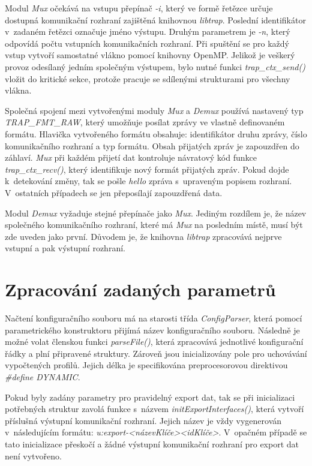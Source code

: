  Modul \textit{Mux} očekává na vstupu přepínač \textit{-i}, který ve formě řetězce určuje dostupná 
 komunikační rozhraní 
 zajištěná knihovnou \textit{libtrap}. Poslední identifikátor v~zadaném řetězci označuje jméno 
 výstupu. Druhým parametrem je \textit{-n}, který odpovídá počtu vstupních komunikačních
 rozhraní. Při spuštění 
 se pro každý vstup vytvoří samostatné vlákno pomocí knihovny OpenMP. Jelikož je veškerý provoz 
 odesílaný jedním společným výstupem, bylo nutné funkci \textit{trap\_ctx\_send()} vložit do
 kritické sekce, 
 protože pracuje se sdílenými strukturami pro všechny vlákna.
 
 Společná spojení mezi vytvořenými moduly \textit{Mux} a \textit{Demux} používá nastavený typ
 \textit{TRAP\_FMT\_RAW},
 který umožňuje posílat zprávy ve vlastně definovaném formátu. Hlavička vytvořeného formátu
 obsahuje: identifikátor druhu zprávy, číslo komunikačního rozhraní a typ formátu. Obsah přijatých zpráv
 je zapouzdřen do záhlaví. \textit{Mux} při každém přijetí dat kontroluje návratový
 kód funkce \textit{trap\_ctx\_recv()}, který identifikuje nový formát přijatých zpráv. Pokud
 dojde k~detekování změny, tak se pošle \textit{hello} zpráva s~upraveným popisem rozhraní.
 V~ostatních případech se jen přeposílají zapouzdřená data.
 
 Modul \textit{Demux} vyžaduje stejné přepínače jako \textit{Mux}. Jediným rozdílem je, že 
 název společného komunikačního rozhraní, které má \textit{Mux} na posledním místě, musí být zde uveden 
 jako první. Důvodem je, že knihovna \textit{libtrap} zpracovává nejprve vstupní a pak
 výstupní rozhraní. 
 
\section{Zpracování zadaných parametrů}

Načtení konfiguračního souboru má na starosti třída \textit{ConfigParser}, která pomocí parametrického
konstruktoru přijímá název konfiguračního souboru. Následně je možné volat členskou funkci
\textit{parseFile()}, která zpracovává jednotlivé konfigurační řádky a plní připravené struktury.
Zároveň jsou inicializovány pole pro uchovávání vypočtených profilů.
Jejich délka je specifikována preprocesorovou direktivou \textit{\#define DYNAMIC}.
 
Pokud byly zadány parametry pro pravidelný export dat, tak se při inicializaci potřebných struktur
zavolá funkce s~názvem \textit{initExportInterfaces()}, která vytvoří příslušná výstupní komunikační 
rozhraní. Jejich název je vždy vygenerován v~následujícím formátu: 
\textit{u:export-<názevKlíče><idKlíče>}. V~opačném případě se tato inicializace přeskočí a žádné
výstupní komunikační rozhraní pro export dat není vytvořeno.
   
